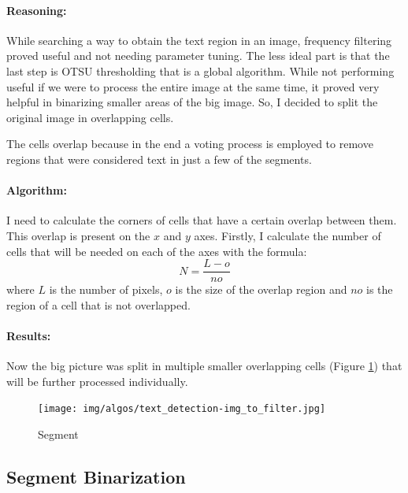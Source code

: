 \paragraph*{Reasoning:}\mbox{}\par
While searching a way to obtain the text region in an image, frequency filtering proved useful and not needing parameter tuning. The less ideal part is that the last step is OTSU thresholding that is a global algorithm. While not performing useful if we were to process the entire image at the same time, it proved very helpful in binarizing smaller areas of the big image. So, I decided to split the original image in overlapping cells.

The cells overlap because in the end a voting process is employed to remove regions that were considered text in just a few of the segments.

\paragraph*{Algorithm:}\mbox{}\par
I need to calculate the corners of cells that have a certain overlap between them. This overlap is present on the $x$ and $y$ axes. Firstly, I calculate the number of cells that will be needed on each of the axes with the formula:
\[N = \frac{L - o}{no}\]
where $L$ is the number of pixels, $o$ is the size of the overlap region and $no$ is the region of a cell that is not overlapped.

\paragraph*{Results:}\mbox{}\par
Now the big picture was split in multiple smaller overlapping cells (Figure \ref{fig:text_detection-segment}) that will be further processed individually.

\begin{figure}
    \centering
    \texttt{[image: img/algos/text\_detection-img\_to\_filter.jpg]}
    \caption{Segment}
    \label{fig:text_detection-segment}
\end{figure}

\subsection{Segment Binarization}

